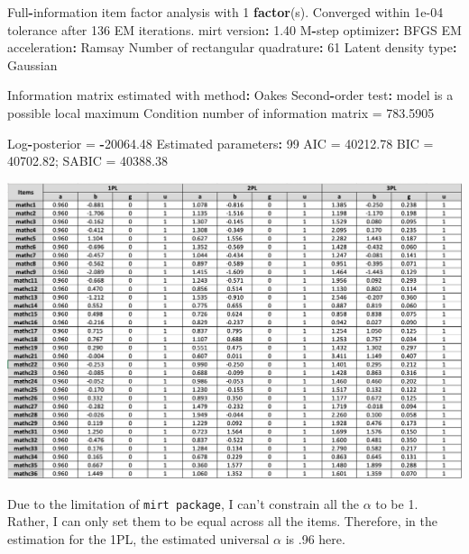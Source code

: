 \documentclass[
]{article}
\newenvironment{Shaded}{\begin{snugshade}}{\end{snugshade}}
\newcommand{\DecValTok}[1]{\textcolor[rgb]{0.00,0.00,0.81}{#1}}
\newcommand{\FloatTok}[1]{\textcolor[rgb]{0.00,0.00,0.81}{#1}}
\newcommand{\FunctionTok}[1]{\textcolor[rgb]{0.13,0.29,0.53}{\textbf{#1}}}
\newcommand{\NormalTok}[1]{#1}
\newcommand{\OtherTok}[1]{\textcolor[rgb]{0.56,0.35,0.01}{#1}}
\newcommand{\SpecialCharTok}[1]{\textcolor[rgb]{0.81,0.36,0.00}{\textbf{#1}}}
\begin{document}
\begin{Shaded}
\begin{Highlighting}[]
\NormalTok{Full}\SpecialCharTok{{-}}\NormalTok{information item factor analysis with }\DecValTok{1} \FunctionTok{factor}\NormalTok{(s).}
\NormalTok{Converged within }\FloatTok{1e{-}04}\NormalTok{ tolerance after }\DecValTok{136}\NormalTok{ EM iterations.}
\NormalTok{mirt version}\SpecialCharTok{:} \FloatTok{1.40} 
\NormalTok{M}\SpecialCharTok{{-}}\NormalTok{step optimizer}\SpecialCharTok{:}\NormalTok{ BFGS }
\NormalTok{EM acceleration}\SpecialCharTok{:}\NormalTok{ Ramsay }
\NormalTok{Number of rectangular quadrature}\SpecialCharTok{:} \DecValTok{61}
\NormalTok{Latent density type}\SpecialCharTok{:}\NormalTok{ Gaussian }

\NormalTok{Information matrix estimated with method}\SpecialCharTok{:}\NormalTok{ Oakes}
\NormalTok{Second}\SpecialCharTok{{-}}\NormalTok{order test}\SpecialCharTok{:}\NormalTok{ model is a possible local maximum}
\NormalTok{Condition number of information matrix }\OtherTok{=}  \FloatTok{783.5905}

\NormalTok{Log}\SpecialCharTok{{-}}\NormalTok{posterior }\OtherTok{=} \SpecialCharTok{{-}}\FloatTok{20064.48}
\NormalTok{Estimated parameters}\SpecialCharTok{:} \DecValTok{99} 
\NormalTok{AIC }\OtherTok{=} \FloatTok{40212.78}
\NormalTok{BIC }\OtherTok{=} \FloatTok{40702.82}\NormalTok{; SABIC }\OtherTok{=} \FloatTok{40388.38}
\end{Highlighting}
\end{Shaded}

\includegraphics{all_estimated_items.png}

Due to the limitation of \texttt{mirt\ package}, I can't constrain all
the \(\alpha\) to be 1. Rather, I can only set them to be equal across
all the items. Therefore, in the estimation for the 1PL, the estimated
universal \(\alpha\) is .96 here.
\end{document}
